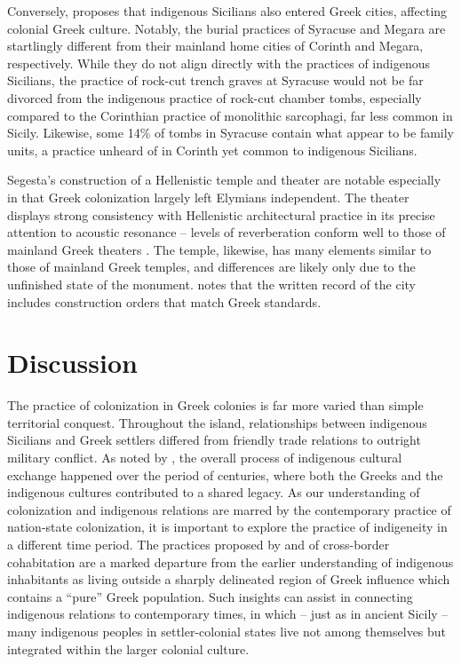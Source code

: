 \documentclass{../../../coursework}
\begin{document}
Conversely, \textcite{Lei99} proposes that indigenous Sicilians also entered
Greek cities, affecting colonial Greek culture. Notably, the burial practices
of Syracuse and Megara are startlingly different from their mainland home
cities of Corinth and Megara, respectively. While they do not align directly
with the practices of indigenous Sicilians, the practice of rock-cut trench
graves at Syracuse would not be far divorced from the indigenous practice of
rock-cut chamber tombs, especially compared to the Corinthian practice of
monolithic sarcophagi, far less common in Sicily. Likewise, some 14\% of tombs
in Syracuse contain what appear to be family units, a practice unheard of in
Corinth yet common to indigenous Sicilians.

Segesta's construction of a Hellenistic temple and theater are notable
especially in that Greek colonization largely left Elymians independent. The
theater displays strong consistency with Hellenistic architectural practice in
its precise attention to acoustic resonance -- levels of reverberation conform
well to those of mainland Greek theaters \parencite{Dan04}. The temple,
likewise, has many elements similar to those of mainland Greek temples, and
differences are likely only due to the unfinished state of the monument.
\textcite{Bur61} notes that the written record of the city includes
construction orders that match Greek standards.

\section{Discussion}

The practice of colonization in Greek colonies is far more varied than simple
territorial conquest. Throughout the island, relationships between indigenous
Sicilians and Greek settlers differed from friendly trade relations to
outright military conflict. As noted by \textcite{Bal12}, the overall process
of indigenous cultural exchange happened over the period of centuries, where
both the Greeks and the indigenous cultures contributed to a shared legacy. As
our understanding of colonization and indigenous relations are marred by the
contemporary practice of nation-state colonization, it is important to explore
the practice of indigeneity in a different time period. The practices proposed
by \textcite{Boa80} and \textcite{Lei99} of cross-border cohabitation are a
marked departure from the earlier understanding of indigenous inhabitants as
living outside a sharply delineated region of Greek influence which contains a
``pure'' Greek population. Such insights can assist in connecting indigenous
relations to contemporary times, in which -- just as in ancient Sicily -- many
indigenous peoples in settler-colonial states live not among themselves but
integrated within the larger colonial culture.

\printbibliography
\end{document}
